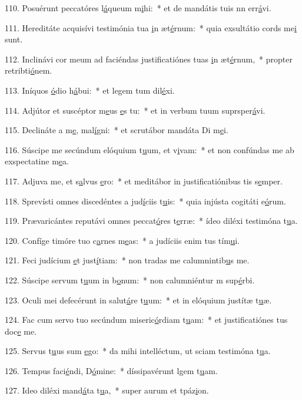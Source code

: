 110. Posuérunt peccatóres l\uline{á}queum m\uline{i}hi:~* et de mandátis tuis nn err\uline{á}vi.\par 
111. Hereditáte acquisívi testimónia tua \uline{i}n æt\uline{é}rnum:~* quia exsultátio cords me\uline{i} sunt.\par 
112. Inclinávi cor meum ad faciéndas justificatiónes tuas \uline{i}n æt\uline{é}rnum,~* propter retribti\uline{ó}nem.\par 
113. Iníquos \uline{ó}dio h\uline{á}bui:~* et legem tum dil\uline{é}xi.\par 
114. Adjútor et suscéptor m\uline{e}us \uline{e}s tu:~* et in verbum tuum suprsper\uline{á}vi.\par 
115. Declináte a m\uline{e}, mal\uline{í}gni:~* et scrutábor mandáta Di m\uline{e}i.\par 
116. Súscipe me secúndum elóquium t\uline{u}um, et v\uline{i}vam:~* et non confúndas me ab exspectatine m\uline{e}a.\par 
117. Adjuva me, et s\uline{a}lvus \uline{e}ro:~* et meditábor in justificatiónibus tis s\uline{e}mper.\par 
118. Sprevísti omnes discedéntes a jud\uline{í}ciis t\uline{u}is:~* quia injústa cogitáti e\uline{ó}rum.\par 
119. Prævaricántes reputávi omnes peccat\uline{ó}res t\uline{e}rræ:~* ídeo diléxi testimóna t\uline{u}a.\par 
120. Confíge timóre tuo c\uline{a}rnes m\uline{e}as:~* a judíciis enim tus tím\uline{u}i.\par 
121. Feci judícium \uline{e}t just\uline{í}tiam:~* non tradas me calumnintib\uline{u}s me.\par 
122. Súscipe servum t\uline{u}um in b\uline{o}num:~* non calumniéntur m sup\uline{é}rbi.\par 
123. Oculi mei defecérunt in salut\uline{á}re t\uline{u}um:~* et in elóquium justítæ t\uline{u}æ.\par 
124. Fac cum servo tuo secúndum miseric\uline{ó}rdiam t\uline{u}am:~* et justificatiónes tus doc\uline{e} me.\par 
125. Servus t\uline{u}us sum \uline{e}go:~* da mihi intelléctum, ut sciam testimóna t\uline{u}a.\par 
126. Tempus faci\uline{é}ndi, D\uline{ó}mine:~* díssipavérunt lgem t\uline{u}am.\par 
127. Ideo diléxi mand\uline{á}ta t\uline{u}a,~* super aurum et tpáz\uline{i}on.\par 
